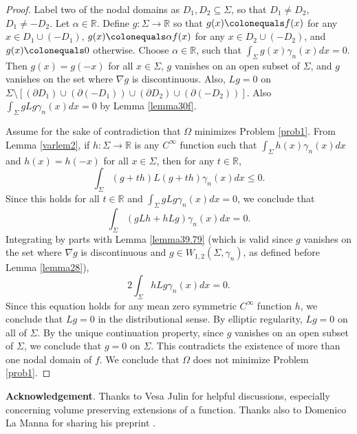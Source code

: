 \documentclass[12pt,reqno]{amsart}
\theoremstyle{definition}
\renewcommand{\subset}{\subseteq}
\newcommand{\R}{\mathbb{R}}
\newcommand{\sdimn}{n}
\begin{document}
\begin{proof}
Label two of the nodal domains as $D_{1},D_{2}\subset\Sigma$, so that $D_{1}\neq D_{2}$, $D_{1}\neq -D_{2}$.  Let $\alpha\in\R$.  Define $g\colon\Sigma\to\R$ so that $g(x)\colonequals f(x)$ for any $x\in D_{1}\cup(-D_{1})$, $g(x)\colonequals \alpha f(x)$ for any $x\in D_{2}\cup(-D_{2})$, and $g(x)\colonequals 0$ otherwise.  Choose $\alpha\in\R$, such that $\int_{\Sigma}g(x)\gamma_{\sdimn}(x)dx=0$. Then $g(x)=g(-x)$ for all $x\in\Sigma$, $g$ vanishes on an open subset of $\Sigma$, and $g$ vanishes on the set where $\nabla g$ is discontinuous.  Also, $Lg=0$ on $\Sigma\setminus[(\partial D_{1})\cup(\partial (- D_{1}))\cup(\partial D_{2})\cup(\partial (- D_{2}))]$.  Also $\int_{\Sigma}gLg\gamma_{\sdimn}(x)dx=0$ by Lemma \ref{lemma30f}.

Assume for the sake of contradiction that $\Omega$ minimizes Problem \ref{prob1}.  From Lemma \ref{varlem2}, if $h\colon\Sigma\to\R$ is any $C^{\infty}$ function such that $\int_{\Sigma}h(x)\gamma_{\sdimn}(x)dx$ and $h(x)=h(-x)$ for all $x\in\Sigma$, then for any $t\in\R$,
$$\int_{\Sigma}(g+th)L(g+th)\gamma_{\sdimn}(x)dx\leq0.$$
Since this holds for all $t\in\R$ and $\int_{\Sigma}gLg\gamma_{\sdimn}(x)dx=0$, we conclude that
$$\int_{\Sigma}(gLh+hLg)\gamma_{\sdimn}(x)dx=0.$$
Integrating by parts with Lemma \ref{lemma39.79} (which is valid since $g$ vanishes on the set where $\nabla g$ is discontinuous and $g\in W_{1,2}(\Sigma,\gamma_{\sdimn})$, as defined before Lemma \ref{lemma28}),
$$2\int_{\Sigma}hLg\gamma_{\sdimn}(x)dx=0.$$
Since this equation holds for any mean zero symmetric $C^{\infty}$ function $h$, we conclude that $Lg=0$ in the distributional sense.  By elliptic regularity, $Lg=0$ on all of $\Sigma$.  By the unique continuation property, since $g$ vanishes on an open subset of $\Sigma$, we conclude that $g=0$ on $\Sigma$.  This contradicts the existence of more than one nodal domain of $f$.  We conclude that $\Omega$ does not minimize Problem \ref{prob1}.
\end{proof}


\medskip
\noindent\textbf{Acknowledgement}.  Thanks to Vesa Julin for helpful discussions, especially concerning volume preserving extensions of a function.  Thanks also to Domenico La Manna for sharing his preprint \cite{lamanna17}.

%


\end{document}
